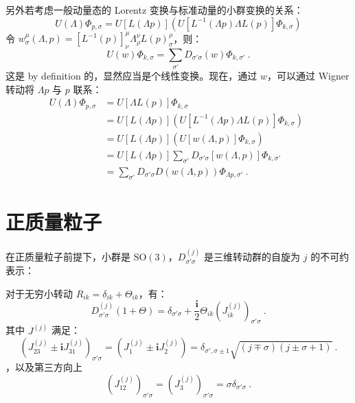 另外若考虑一般动量态的 Lorentz 变换与标准动量的小群变换的关系：
\begin{equation}
	U(\Lambda) \Phi_{p, \sigma} = U[L(\Lambda p)] (U[L^{-1} (\Lambda p) \Lambda L(p)] \Phi_{k, \sigma}) 
\end{equation}
令 $w^\mu_\sigma(\Lambda, p) = [L^{-1}(p)]^\mu_\nu \Lambda^\nu_\rho L(p)^\rho_\sigma$，则：
\begin{equation}
	U(w) \Phi_{k, \sigma} = \sum_{\sigma'} D_{\sigma' \sigma}(w) \Phi_{k, \sigma'} ~.
\end{equation}
这是 by definition 的，显然应当是个线性变换。现在，通过 $w$，可以通过 Wigner 转动将 $\Lambda p$ 与 $p$ 联系：
\begin{equation}
	\begin{aligned}
		U(\Lambda) \Phi_{p, \sigma} 
		&= U[\Lambda L(p)] \Phi_{k, \sigma} \\
		&= U[L(\Lambda p)] (U[L^{-1}(\Lambda p) \Lambda L(p)] \Phi_{k, \sigma}) \\
		&= U[L(\Lambda p)] (U[w(\Lambda, p)] \Phi_{k, \sigma}) \\
		&= U[L(\Lambda p)] \sum_{\sigma '} D_{\sigma ' \sigma}[w(\Lambda, p)] \Phi_{k, \sigma'} \\
		&= \sum_{\sigma'} D_{\sigma' \sigma} D\left(w(\Lambda, p)\right) \Phi_{\Lambda p, \sigma'} ~.
	\end{aligned} ~~
\end{equation}

\section{正质量粒子}
在正质量粒子前提下，小群是 $\text{SO}(3)$，$D^{(j)}_{\sigma' \sigma}$ 是三维转动群的自旋为 $j$ 的不可约表示：

对于无穷小转动 $R_{ik} = \delta_{ik} + \Theta_{ik}$，有：
\begin{equation}
	D_{\sigma' \sigma}^{(j)} (1+\Theta) = \delta_{\sigma' \sigma} + \frac{\mathbf{i}}{2} \Theta_{ik} \left(J_{ik}^{(j)}\right)_{\sigma' \sigma} ~.
\end{equation}
其中 $J^{(j)}$ 满足：
\begin{equation}
	\left(J^{(j)}_{23} \pm \mathbf{i} J_{31}^{(j)}\right)_{\sigma' \sigma} = \left(J_1^{(j)} \pm \mathbf{i} J_2^{(j)}\right) = \delta_{\sigma', \sigma \pm 1} \sqrt{(j \mp \sigma)(j \pm \sigma + 1)} ~.
\end{equation}
，以及第三方向上
\begin{equation}
	\left(J_{12}^{(j)}\right)_{\sigma' \sigma} = \left(J^{(j)}_3\right)_{\sigma' \sigma} = \sigma \delta_{\sigma' \sigma} ~.
\end{equation}

